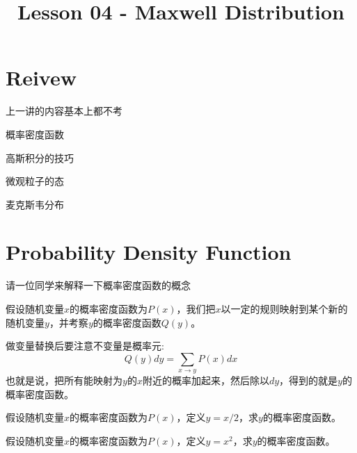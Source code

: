 \documentclass[CJK]{beamer}
\title{Lesson 04 - Maxwell Distribution}
\author{}
\date{}
\begin{document}

\section{Reivew}

\begin{frame}
\bch
上一讲的内容基本上都不考
\ech
\end{frame}


\begin{frame}
\bch
\bitem
\item{概率密度函数}
\item{高斯积分的技巧}
\item{微观粒子的态}
\item{麦克斯韦分布}
\eitem
\ech
\end{frame}

\section{Probability Density Function}

\begin{frame}
\bch
{}

请一位同学来解释一下概率密度函数的概念
\ech
\end{frame}

\begin{frame}
\bch
假设随机变量$x$的概率密度函数为$P(x)$，我们把$x$以一定的规则映射到某个新的随机变量$y$，并考察$y$的概率密度函数$Q(y)$。

\skiplines

做变量替换后要注意不变量是概率元:
$$Q(y) dy = \sum_{x\rightarrow y} P(x) dx$$
也就是说，把所有能映射为$y$的$x$附近的概率加起来，然后除以$dy$，得到的就是$y$的概率密度函数。
\ech
\end{frame}


\begin{frame}
\bch


假设随机变量$x$的概率密度函数为$P(x)$，定义$y=x/2$，求$y$的概率密度函数。
\ech
\end{frame}

\begin{frame}
\bch


假设随机变量$x$的概率密度函数为$P(x)$，定义$y=x^2$，求$y$的概率密度函数。
\ech
\end{frame}
\end{document}
